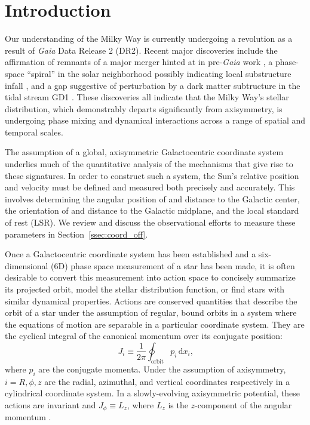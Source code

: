 \documentclass[twocolumn]{aastex62}
\newcommand{\beq}{\begin{equation}}
\newcommand{\eeq}{\end{equation}}
\begin{document}

\section{Introduction} \label{sec:intro} 
Our understanding of the Milky Way is currently undergoing a revolution as a
result of \textit{Gaia} Data Release 2 (DR2). Recent major discoveries include
the affirmation of remnants of a major merger \citep{2018ApJ...860L..11K,
2018MNRAS.478..611B, 2018Natur.563...85H, 2019MNRAS.486..378L,
2019MNRAS.482.3426M} hinted at in pre-\textit{Gaia} work
\citep[e.g.,][]{2005MNRAS.359...93M, 2011MNRAS.412.1203N}, a phase-space
``spiral'' in the solar neighborhood \citep{2018Natur.561..360A} possibly
indicating local substructure infall \citep{2018MNRAS.481.1501B,
2019MNRAS.485.3134L}, and a gap suggestive of perturbation by a dark matter
subtructure in the tidal stream GD1 \citep{2018ApJ...863L..20P,
2018arXiv181103631B}. These discoveries all indicate that the Milky Way's
stellar distribution, which demonstrably departs significantly from
axisymmetry, is undergoing phase mixing and dynamical interactions across a
range of spatial and temporal scales.

The assumption of a global, axisymmetric Galactocentric coordinate system
\citep{2008gady.book.....B} underlies much of the quantitative analysis of the
mechanisms that give rise to these signatures. In order to construct such a
system, the Sun's relative position and velocity must be defined and measured
both precisely and accurately. This involves determining the angular position
of and distance to the Galactic center, the orientation of and distance to the
Galactic midplane, and the local standard of rest (LSR). We review and discuss
the observational efforts to measure these parameters in
Section~\ref{ssec:coord_off}.

Once a Galactocentric coordinate system has been established and a
six-dimensional (6D) phase space measurement of a star has been made, it is
often desirable to convert this measurement into action space to concisely
summarize its projected orbit, model the stellar distribution function, or
find stars with similar dynamical properties. Actions are conserved quantities
that describe the orbit of a star under the assumption of regular, bound
orbits in a system where the equations of motion are separable in a particular
coordinate system. They are the cyclical integral of the canonical momentum
over its conjugate position:
\beq\label{eq:actions} 
J_i \equiv \frac{1}{2\pi}
\oint_{\text{orbit}}p_i\,\text{d}x_i\text{,}
\eeq 
where $p_i$ are the conjugate momenta. Under the assumption of axisymmetry,
$i=R,\phi,z$ are the radial, azimuthal, and vertical coordinates respectively
in a cylindrical coordinate system. In a slowly-evolving axisymmetric
potential, these actions are invariant and $J_{\phi} \equiv L_z$, where $L_z$
is the $z$-component of the angular momentum
\citep{2008gady.book.....B,2014RvMP...86....1S}.
\end{document}
